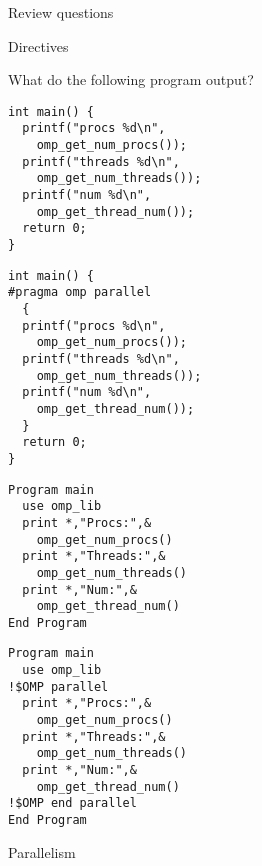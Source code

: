 \pagebreak

 {Review questions}

 {Directives}

What do the following program output?
\lstset{frame=single}

\lstset{language=C}
\begin{multicols}{2}
\small
\begin{lstlisting}
int main() {
  printf("procs %d\n",
    omp_get_num_procs());
  printf("threads %d\n",
    omp_get_num_threads());
  printf("num %d\n",
    omp_get_thread_num());
  return 0;
}
\end{lstlisting}
\columnbreak

\begin{lstlisting}
int main() {
#pragma omp parallel
  {
  printf("procs %d\n",
    omp_get_num_procs());
  printf("threads %d\n",
    omp_get_num_threads());
  printf("num %d\n",
    omp_get_thread_num());
  }
  return 0;
}
\end{lstlisting}
\end{multicols}

\lstset{language=Fortran}
\begin{multicols}{2}
\small
\begin{lstlisting}
Program main
  use omp_lib
  print *,"Procs:",&
    omp_get_num_procs()
  print *,"Threads:",&
    omp_get_num_threads()
  print *,"Num:",&
    omp_get_thread_num()
End Program
\end{lstlisting}
\columnbreak

\begin{lstlisting}
Program main
  use omp_lib
!$OMP parallel
  print *,"Procs:",&
    omp_get_num_procs()
  print *,"Threads:",&
    omp_get_num_threads()
  print *,"Num:",&
    omp_get_thread_num()
!$OMP end parallel
End Program
\end{lstlisting}
\end{multicols}

\vfill\pagebreak

 {Parallelism}

